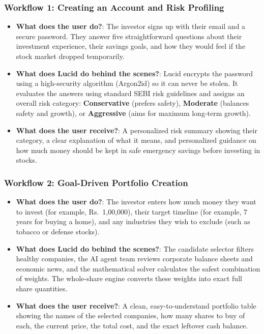 \subsubsection{Workflow 1: Creating an Account and Risk Profiling}
\begin{itemize}
    \item \textbf{What does the user do?}: The investor signs up with their email and a secure password. They answer five straightforward questions about their investment experience, their savings goals, and how they would feel if the stock market dropped temporarily.
    \item \textbf{What does Lucid do behind the scenes?}: Lucid encrypts the password using a high-security algorithm (Argon2id) so it can never be stolen. It evaluates the answers using standard SEBI risk guidelines and assigns an overall risk category: \textbf{Conservative} (prefers safety), \textbf{Moderate} (balances safety and growth), or \textbf{Aggressive} (aims for maximum long-term growth).
    \item \textbf{What does the user receive?}: A personalized risk summary showing their category, a clear explanation of what it means, and personalized guidance on how much money should be kept in safe emergency savings before investing in stocks.
\end{itemize}

\subsubsection{Workflow 2: Goal-Driven Portfolio Creation}
\begin{itemize}
    \item \textbf{What does the user do?}: The investor enters how much money they want to invest (for example, Rs.~1,00,000), their target timeline (for example, 7 years for buying a home), and any industries they wish to exclude (such as tobacco or defense stocks).
    \item \textbf{What does Lucid do behind the scenes?}: The candidate selector filters healthy companies, the AI agent team reviews corporate balance sheets and economic news, and the mathematical solver calculates the safest combination of weights. The whole-share engine converts these weights into exact full share quantities.
    \item \textbf{What does the user receive?}: A clean, easy-to-understand portfolio table showing the names of the selected companies, how many shares to buy of each, the current price, the total cost, and the exact leftover cash balance.
\end{itemize}

